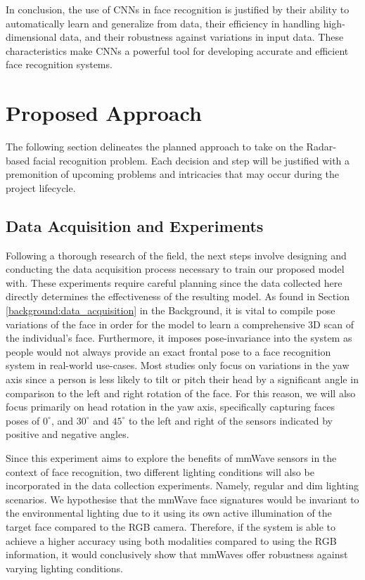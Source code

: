 \documentclass{interim}
\begin{document}
In conclusion, the use of CNNs in face recognition is justified by their ability to automatically learn and generalize from data, their efficiency in handling high-dimensional data, and their robustness against variations in input data. These characteristics make CNNs a powerful tool for developing accurate and efficient face recognition systems.


\section{Proposed Approach}
The following section delineates the planned approach to take on the Radar-based facial recognition problem. Each decision and step will be justified with a premonition of upcoming problems and intricacies that may occur during the project lifecycle.

\subsection{Data Acquisition and Experiments}
Following a thorough research of the field, the next steps involve designing and conducting the data acquisition process necessary to train our proposed model with. These experiments require careful planning since the data collected here directly determines the effectiveness of the resulting model. As found in Section \ref{background:data_acquisition} in the Background, it is vital to compile pose variations of the face in order for the model to learn a comprehensive 3D scan of the individual's face. Furthermore, it imposes pose-invariance into the system as people would not always provide an exact frontal pose to a face recognition system in real-world use-cases. Most studies only focus on variations in the yaw axis since a person is less likely to tilt or pitch their head by a significant angle in comparison to the left and right rotation of the face. For this reason, we will also focus primarily on head rotation in the yaw axis, specifically capturing faces poses of $0^\circ$, and $30^\circ$ and $45^\circ$ to the left and right of the sensors indicated by positive and negative angles. 

Since this experiment aims to explore the benefits of mmWave sensors in the context of face recognition, two different lighting conditions will also be incorporated in the data collection experiments. Namely, regular and dim lighting scenarios. We hypothesise that the mmWave face signatures would be invariant to the environmental lighting due to it using its own active illumination of the target face compared to the RGB camera. Therefore, if the system is able to achieve a higher accuracy using both modalities compared to using the RGB information, it would conclusively show that mmWaves offer robustness against varying lighting conditions.
\end{document}
